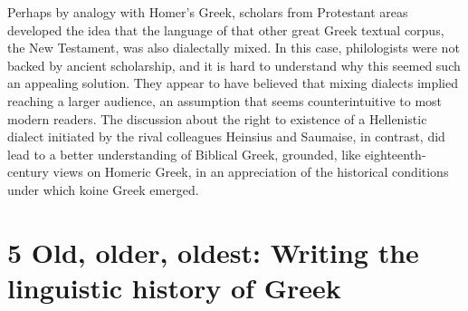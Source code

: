 \documentclass[output=paper]{langsci/langscibook}
\begin{document}
Perhaps by analogy with Homer’s Greek, scholars from Protestant areas developed the idea that the language of that other great Greek textual corpus, the New Testament, was also dialectally mixed. In this case, philologists were not backed by ancient scholarship, and it is hard to understand why this seemed such an appealing solution. They appear to have believed that mixing dialects implied reaching a larger audience, an assumption that seems counterintuitive to most modern readers. The discussion about the right to existence of a Hellenistic dialect initiated by the rival colleagues Heinsius and Saumaise, in contrast, did lead to a better understanding of Biblical Greek, grounded, like eighteenth-century views on Homeric Greek, in an appreciation of the historical conditions under which koine Greek emerged.

\section{\textsc{5} Old, older, oldest: Writing the linguistic history of Greek}
\hypertarget{Toc19704834}{}
\end{document}
